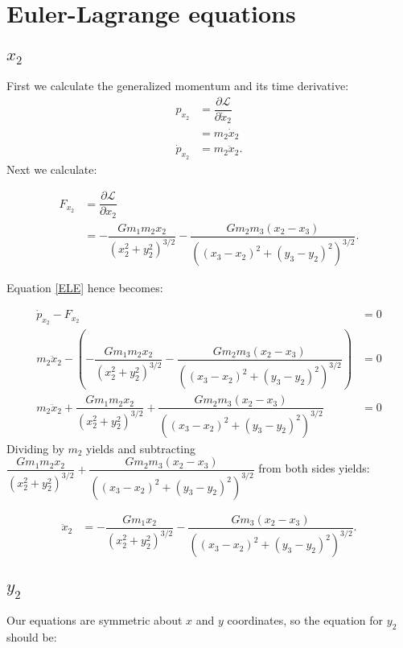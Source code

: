 \documentclass[12pt,a4paper,portrait]{article}
\begin{document}
	\section{Euler-Lagrange equations}
	\subsection{$x_2$}
	First we calculate the generalized momentum and its time derivative:
	\begin{align*}
		p_{x_2} &= \dfrac{\partial \mathcal{L}}{\partial \dot{x}_2} \\
		&= m_2 \dot{x}_2 \\
		\dot{p}_{x_2} &= m_2 \ddot{x}_2.
	\end{align*}
	Next we calculate:
	
	\begin{align*}
		F_{x_2} &= \dfrac{\partial \mathcal{L}}{\partial x_2} \\
		&= -\dfrac{Gm_1 m_2x_2}{\left(x_2^2+y_2^2\right)^{3/2}} -\dfrac{Gm_2m_3(x_2-x_3)}{\left((x_3-x_2)^2+(y_3-y_2)^2\right)^{3/2}}.
	\end{align*}
	
	Equation \eqref{ELE} hence becomes:
	
	\begin{align*}
		\dot{p}_{x_2} - F_{x_2} &= 0\\
		m_2 \ddot{x}_2 - \left(-\dfrac{Gm_1 m_2x_2}{\left(x_2^2+y_2^2\right)^{3/2}} -\dfrac{Gm_2m_3(x_2-x_3)}{\left((x_3-x_2)^2+(y_3-y_2)^2\right)^{3/2}}\right) &= 0 \\
		m_2 \ddot{x}_2 + \dfrac{Gm_1 m_2x_2}{\left(x_2^2+y_2^2\right)^{3/2}} +\dfrac{Gm_2m_3(x_2-x_3)}{\left((x_3-x_2)^2+(y_3-y_2)^2\right)^{3/2}} &= 0
	\end{align*}
	Dividing by $m_2$ yields and subtracting $\dfrac{Gm_1 m_2x_2}{\left(x_2^2+y_2^2\right)^{3/2}} +\dfrac{Gm_2m_3(x_2-x_3)}{\left((x_3-x_2)^2+(y_3-y_2)^2\right)^{3/2}}$ from both sides yields:
	
	\begin{align*}
		\ddot{x}_2 &= -\dfrac{Gm_1x_2}{\left(x_2^2+y_2^2\right)^{3/2}} -\dfrac{Gm_3(x_2-x_3)}{\left((x_3-x_2)^2+(y_3-y_2)^2\right)^{3/2}}.
	\end{align*}
	
	\subsection{$y_2$}
	Our equations are symmetric about $x$ and $y$ coordinates, so the equation for $y_2$ should be:
	
\end{document}
